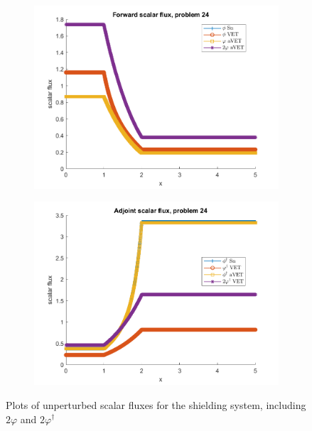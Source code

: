 \documentclass[12pt]{report}
\begin{document}
\begin{appendices}
\begin{figure}[H]
\centering
\begin{subfigure}{.5\textwidth}
  \centering
  \includegraphics[width=.98\linewidth]{figures2/24phi2.png}
\end{subfigure}%
\begin{subfigure}{.5\textwidth}
  \centering
  \includegraphics[width=.98\linewidth]{figures2/24phia2.png}
\end{subfigure}
\caption{Plots of unperturbed scalar fluxes for the shielding system, including $2\varphi$ and $2\varphi^\dag$ }
\label{fig:2Flux2}
\end{figure}


\end{appendices}
\end{document}
